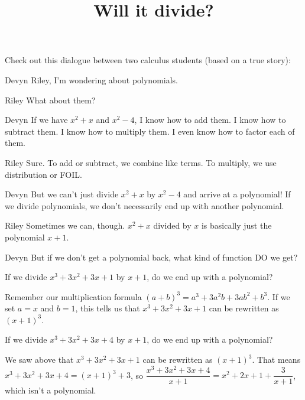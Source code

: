 \documentclass{ximera}
\title[Break-Ground:]{Will it divide?}
\begin{document}
\begin{abstract}
\end{abstract}
\maketitle

Check out this dialogue between two calculus students (based on a true
story):

\begin{dialogue}
\item[Devyn] Riley, I'm wondering about polynomials.
\item[Riley] What about them?
\item[Devyn] If we have $x^2+x$ and $x^2-4$, I know how to add them.  I know how to subtract them.  I know how to multiply them.  I even know how to factor each of them.
\item[Riley] Sure.  To add or subtract, we combine like terms.  To multiply, we use distribution or FOIL.
\item[Devyn] But we can't just divide $x^2+x$ by $x^2-4$ and arrive at a polynomial!  If we divide polynomials, we don't necessarily end up with another polynomial.
\item[Riley] Sometimes we can, though.  $x^2 + x$ divided by $x$ is basically just the polynomial $x+1$.
\item[Devyn] But if we don't get a polynomial back, what kind of function DO we get?
\end{dialogue}

\begin{problem}
	If we divide $x^3 + 3x^2 + 3x + 1$ by $x+1$, do we end up with a polynomial?
	\begin{multipleChoice}
	\end{multipleChoice}
	\begin{feedback}
		Remember our multiplication formula $(a+b)^3 = a^3 + 3 a^2 b + 3 a b^2 + b^3$.  If we set $a = x$ and $b = 1$, this tells us that
		$x^3 + 3x^2 + 3x + 1$ can be rewritten as $(x + 1)^3$.
	\end{feedback}
\end{problem}

\begin{problem}
	If we divide $x^3 + 3x^2 + 3x + 4$ by $x+1$, do we end up with a polynomial?
	\begin{multipleChoice}
		\choice{yes}
		\choice[correct]{no}
	\end{multipleChoice}
	\begin{feedback}
		We saw above that $x^3 + 3x^2 + 3x + 1$ can be rewritten as $(x + 1)^3$.  That means $x^3 + 3x^2 + 3x + 4 = (x+1)^3 + 3$,
		so $\displaystyle \dfrac{x^3 + 3x^2 + 3x + 4}{x+1} = x^2 + 2x + 1 + \dfrac{3}{x+1}$, which isn't a polynomial.
	\end{feedback}
\end{problem}






\end{document}

